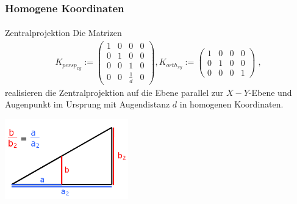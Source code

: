 \documentclass{beamer}
\begin{document}
\begin{frame}
    \frametitle{Homogene Koordinaten}
\framesubtitle{}
\begin{block}{Zentralprojektion}
Die Matrizen
\begin{align*}
K_{persp_{xy}} := \begin{pmatrix}  
1   &  0 & 0 & 0  \\
0   &  1 & 0 & 0  \\
0   &  0 & 1 & 0  \\
0   &  0 & \frac{1}{d} & 0 
\end{pmatrix} ,
K_{orth_{xy}} := \begin{pmatrix}  
1   &  0 & 0 & 0  \\
0   &  1 & 0 & 0  \\
0   &  0 & 0 & 1  
\end{pmatrix} \; ,
\end{align*}
realisieren die Zentralprojektion auf die Ebene parallel zur $X-Y$-Ebene und Augenpunkt im Ursprung mit Augendistanz $d$ in homogenen Koordinaten.

\begin{center}
    \includegraphics[width=0.4\textwidth]{images/strahlensatz}
\end{center}
\end{block}
\end{frame}
\end{document}
